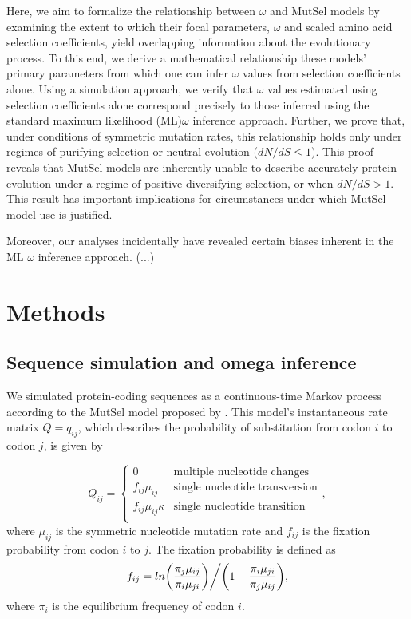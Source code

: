 \documentclass[11pt]{article}
\begin{document}
Here, we aim to formalize the relationship between $\omega$ and MutSel models by examining the extent to which their focal parameters, $\omega$ and scaled amino acid selection coefficients, yield overlapping information about the evolutionary process. To this end, we derive a mathematical relationship these models' primary parameters from which one can infer $\omega$ values from selection coefficients alone. Using a simulation approach, we verify that $\omega$ values estimated using selection coefficients alone correspond precisely to those inferred using the standard maximum likelihood (ML)$\omega$ inference approach. Further, we prove that, under conditions of symmetric mutation rates, this relationship holds only under regimes of purifying selection or neutral evolution ($dN/dS \leq 1$). This proof reveals that MutSel models are inherently unable to describe accurately protein evolution under a regime of positive diversifying selection, or when $dN/dS > 1$. This result has important implications for circumstances under which MutSel model use is justified.

Moreover, our analyses incidentally have revealed certain biases inherent in the ML $\omega$ inference approach. (...)
 


\section*{Methods}

\subsection*{Sequence simulation and omega inference}
We simulated protein-coding sequences as a continuous-time Markov
process \cite{Yang2006} according to the MutSel model proposed by \cite{HalpernBruno1998}. This model's instantaneous rate matrix $Q = q_{ij}$, which describes the probability of substitution from codon $i$ to codon $j$, is given by 

\begin{equation}
Q_{ij} = \left\{ \begin{array}{rl}
              0                                           &\mbox{multiple nucleotide changes} \\
              f_{ij}\mu_{ij}                          &\mbox{single nucleotide transversion} \\
              f_{ij}\mu_{ij}\kappa               &\mbox{single nucleotide transition} \\
         \end{array} \right.,
\end{equation} where $\mu_{ij}$ is the symmetric nucleotide mutation rate and $f_{ij}$ is the fixation probability from codon $i$ to $j$. The fixation probability is defined as \begin{equation}f_{ij} = ln\bigg{(}\frac{\pi_j\mu_{ij}}{\pi_i\mu_{ji}}\bigg{)}\bigg{/}\bigg{(}1 - \frac{\pi_i\mu_{ji}}{\pi_j\mu_{ij}}\bigg{)},\end{equation} where $\pi_i$ is the equilibrium frequency of codon $i$.
\end{document}
